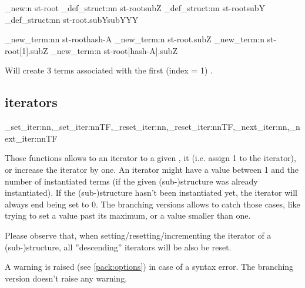 \documentclass[10pt]{article}
\begin{document}
\begin{codestore}[store-env=demo6]
\starray_new:n {st-root}
\starray_def_struct:nn {st-root}{subZ}
\starray_def_struct:nn {st-root}{subY}
\starray_def_struct:nn {st-root.subY}{subYYY}

\starray_new_term:nn {st-root}{hash-A}
\starray_new_term:n {st-root.subZ}
\starray_new_term:n {st-root[1].subZ}
\starray_new_term:n {st-root[hash-A].subZ}
\end{codestore}
 
Will create 3  terms associated with the first (index = 1) .


\subsection{iterators}\label{pack:iter}

\begin{codedescribe}{\starray_set_iter:nn,\starray_set_iter:nnTF,\starray_reset_iter:nn,\starray_reset_iter:nnTF,\starray_next_iter:nn,\starray_next_iter:nnTF}
\begin{codesyntax}%
\end{codesyntax}
\end{codedescribe}
Those functions allows to  an iterator to a given ,  it (i.e. assign 1 to the iterator), or increase the iterator by one. An iterator might have a value between 1 and the number of instantiated terms (if the given (sub-)structure was already instantiated). If the (sub-)structure hasn't been instantiated yet, the iterator will always end being set to 0. The branching versions allows to catch those cases, like trying to set a value past its maximum, or a value smaller than one.

\begin{tsremark}[Important:]
Please observe that, when setting/resetting/incrementing the  iterator of a (sub-)structure, all ''descending'' iterators will be also be reset.
\end{tsremark}
\begin{tsremark}
A warning is raised (see \ref{pack:options}) in case of a  syntax error. The branching version doesn't raise any warning.
\end{tsremark}
\end{document}
